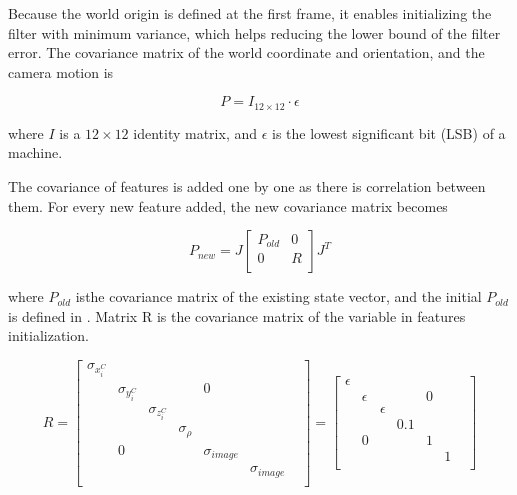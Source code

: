 Because the world origin is defined at the first frame, it enables 
initializing the filter with minimum variance, which helps reducing the 
lower bound of the filter error. The covariance matrix of the world 
coordinate and orientation, and the camera motion is 

\begin{equation}
P=I_{12\times 12}\cdot \epsilon 
\end{equation}

where $I$ is a $12\times12$ identity matrix, and $\epsilon $ is the 
lowest significant bit (LSB) of a machine.

The covariance of features is added one by one as there is 
correlation between them. For every new feature added, the new 
covariance matrix becomes

\begin{equation}
P_{new}=J\begin{bmatrix}
P_{old} & 0 \\
0 & R \\
\end{bmatrix}
J^{T}
\end{equation}

\noindent where $P_{old}$ isthe covariance matrix of the existing state vector, 
and the initial $P_{old}$ is defined in . Matrix R is the covariance 
matrix of the variable in features initialization.

\begin{equation}
R=\begin{bmatrix}
\sigma _{x_{i}^{C}} & & & & & & \\
 & \sigma _{y_{i}^{C}} & & & 0 & & \\
 & & \sigma _{z_{i}^{C}} & & & & \\
 & & & \sigma _{\rho } & & & \\
 & 0 & & & \sigma _{image} & & \\
 & & & & & \sigma _{image} & \\
\end{bmatrix}
 = \begin{bmatrix}
\epsilon & & & & & & \\
 & \epsilon & & & 0 & & \\
 & & \epsilon & & & & \\
 & & & 0.1 & & & \\
 & 0 & & & 1 & & \\
 & & & & & 1 & \\
\end{bmatrix} 
\end{equation}


